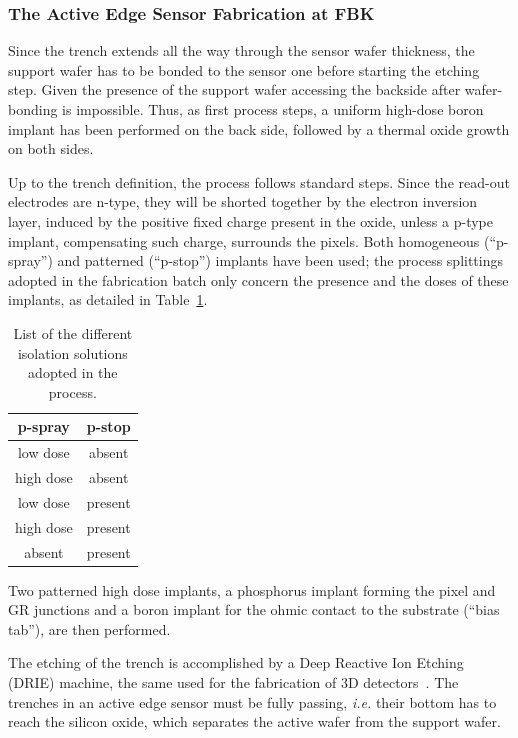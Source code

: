 \subsubsection{The Active Edge Sensor Fabrication at FBK}
Since the trench extends all the way through the sensor wafer thickness, the support wafer has to 
be bonded to the sensor one before starting the etching step.
Given the presence of the  support wafer  accessing the backside  after wafer-bonding is impossible.
Thus, as first process steps, a uniform high-dose boron implant has been performed on the back side, 
followed by a thermal oxide growth on
both sides.

Up to the trench definition, the process follows standard steps. Since the read-out electrodes are n-type, they will be shorted together by the electron
inversion layer, induced by the positive fixed charge present in the oxide, unless a p-type implant, compensating such charge, surrounds the pixels.
Both homogeneous (``p-spray'') and patterned (``p-stop'') implants have been used;
the process splittings adopted in the fabrication batch only concern the presence and the doses of these implants,  as detailed in Table~\ref{tab:isolation}.



\begin{table}[!htpb]
\caption{\label{tab:isolation}List of the different isolation solutions adopted in the process.}
\begin{center}
\begin{tabular}{cc}
\hline
p-spray    & p-stop \\
\hline
\hline
  low dose &      absent\\
  high   dose  &   absent\\
  low   dose &     present\\
  high  dose  &   present\\
  absent  &   present
\end{tabular}
\end{center}
\end{table}

Two patterned high dose implants, a  phosphorus implant forming the pixel and GR junctions  and a boron implant for  the ohmic contact
 to the substrate (``bias tab''), are then performed.

The etching of the trench is accomplished by a Deep Reactive Ion Etching (DRIE) machine, the same used for the fabrication of
3D detectors~\cite{bib:3DFBK}. The trenches in an active edge sensor must be fully passing, {\it i.e.} their bottom  has to reach  the silicon oxide, which separates the active wafer from the 
support wafer.

